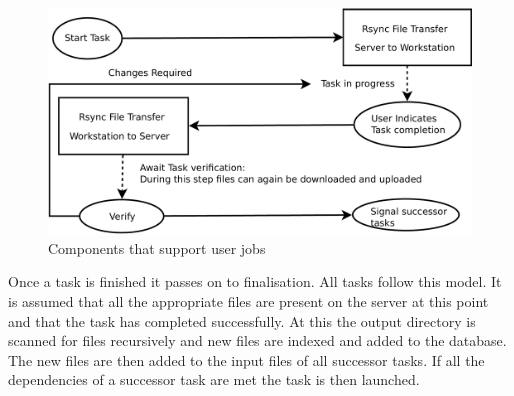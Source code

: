 \begin{figure}[!h]
    \begin{center}
        \includegraphics[scale=0.35]{figures/user_impl2.pdf}
    \end{center}
    \caption{Components that support user jobs}
    \label{user_task_impl2}
\end{figure}
    Once a task is finished it passes on to finalisation. All tasks follow this model. It
    is assumed that all the appropriate files are present on the server at this point and
    that the task has completed successfully. At this the output directory is scanned for
    files recursively and new files are indexed and added to the database. The new files are then
    added to the input files of all successor tasks. If all the dependencies of a successor
    task are met the task is then launched.

